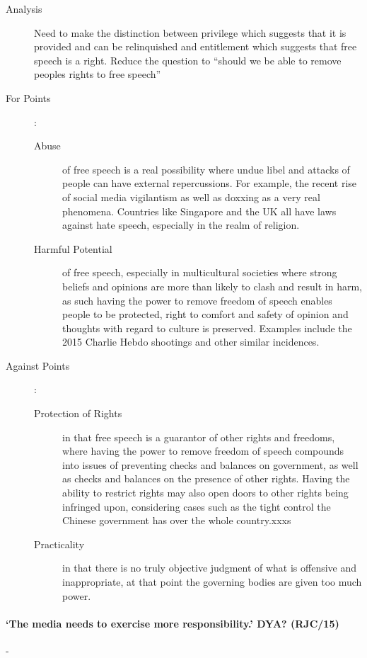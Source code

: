 \documentclass[../../main]{subfiles}
\begin{document}
\begin{description}
	\item[Analysis] Need to make the distinction between privilege which suggests that it is provided and can be relinquished and entitlement which suggests that free speech is a right. Reduce the question to ``should we be able to remove peoples rights to free speech''
	\item[For Points] :
		\begin{description}
			\item[Abuse] of free speech is a real possibility where undue libel and attacks of people can have external repercussions. For example, the recent rise of social media vigilantism as well as doxxing as a very real phenomena. Countries like Singapore and the UK all have laws against hate speech, especially in the realm of religion.
			\item[Harmful Potential] of free speech, especially in multicultural societies where strong beliefs and opinions are more than likely to clash and result in harm, as such having the power to remove freedom of speech enables people to be protected, right to comfort and safety of opinion and thoughts with regard to culture is preserved. Examples include the 2015 Charlie Hebdo shootings and other similar incidences.
		\end{description}
	\item[Against Points]:
		\begin{description}
			\item[Protection of Rights] in that free speech is a guarantor of other rights and freedoms, where having the power to remove freedom of speech compounds into issues of preventing checks and balances on government, as well as checks and balances on the presence of other rights. Having the ability to restrict rights may also open doors to other rights being infringed upon, considering cases such as the tight control the Chinese government has over the whole country.xxxs
			\item[Practicality] in that there is no truly objective judgment of what is offensive and inappropriate, at that point the governing bodies are given too much power. 
		\end{description}
\end{description}

\paragraph{`The media needs to exercise more responsibility.' DYA? (RJC/15)}-
\end{document}
